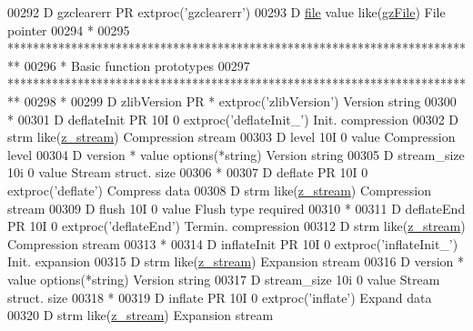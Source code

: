 \begin{DoxyCode}
00292      D gzclearerr      PR                  extproc('gzclearerr')
00293      D  \hyperlink{structfile}{file}                               value like(\hyperlink{structgz_file__s}{gzFile})                   File pointer
00294       *
00295       **************************************************************************
00296       *                        Basic function prototypes
00297       **************************************************************************
00298       *
00299      D zlibVersion     PR              *   extproc('zlibVersion')               Version \textcolor{keywordtype}{string}
00300       *
00301      D deflateInit     PR            10I 0 extproc('deflateInit\_')              Init. compression
00302      D  strm                               like(\hyperlink{structz__stream__s}{z\_stream})                       Compression stream
00303      D  level                        10I 0 value                                Compression level
00304      D  version                        *   value options(*\textcolor{keywordtype}{string})               Version \textcolor{keywordtype}{string}
00305      D  stream\_size                  10i 0 value                                Stream struct. size
00306       *
00307      D deflate         PR            10I 0 extproc('deflate')                   Compress data
00308      D  strm                               like(\hyperlink{structz__stream__s}{z\_stream})                       Compression stream
00309      D  flush                        10I 0 value                                Flush type required
00310       *
00311      D deflateEnd      PR            10I 0 extproc('deflateEnd')                Termin. compression
00312      D  strm                               like(\hyperlink{structz__stream__s}{z\_stream})                       Compression stream
00313       *
00314      D inflateInit     PR            10I 0 extproc('inflateInit\_')              Init. expansion
00315      D  strm                               like(\hyperlink{structz__stream__s}{z\_stream})                       Expansion stream
00316      D  version                        *   value options(*\textcolor{keywordtype}{string})               Version \textcolor{keywordtype}{string}
00317      D  stream\_size                  10i 0 value                                Stream struct. size
00318       *
00319      D inflate         PR            10I 0 extproc('inflate')                   Expand data
00320      D  strm                               like(\hyperlink{structz__stream__s}{z\_stream})                       Expansion stream

\end{DoxyCode}
